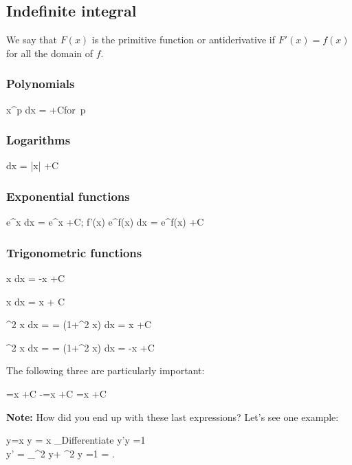 \subsection{Indefinite integral}

We say that $F(x)$ is the primitive function or antiderivative if $F'(x)=f(x)$ for all the
domain of $f$.

\subsubsection{Polynomials}
\bnn
 \int x^p dx = +C\quad \mbox{for }p 
\enn

\subsubsection{Logarithms}
\bnn
\int {}dx = \log |x| +C
\enn

\subsubsection{Exponential functions}
\bnn
\int e^x dx = e^x +C; \quad	\int f'(x) e^f(x) dx = e^f(x) +C
\enn

\subsubsection{Trigonometric functions}
\bnn
\int \sin x dx = -\cos x +C
\enn

\bnn
\int \cos x dx = \sin x + C
\enn

\bnn
\int \sec^2 x dx = \int {} = \int (1+\tan^2 x) dx = \tan x +C
\enn

\bnn
\int \csc^2 x dx = \int {} = \int (1+\cot^2 x) dx = -\cot x +C
\enn

The following three are particularly important:

\bnn
\int {}=\arctan x +C
\enn
\bnn
\int -=\arccos x +C
\enn
\bnn
\int {}=\arcsin x +C
\enn

{\bf Note:} How did you end up with these last expressions? Let's see one example:

\bnn
y=\arcsin x \quad \rightarrow \sin y = x \quad \underbrace{\rightarrow}_{\mbox{Differentiate}} y'\cos y =1 \\
y' = \underbrace{=}_{\sin^2 y+ \cos^2 y =1 }  = .
\enn

